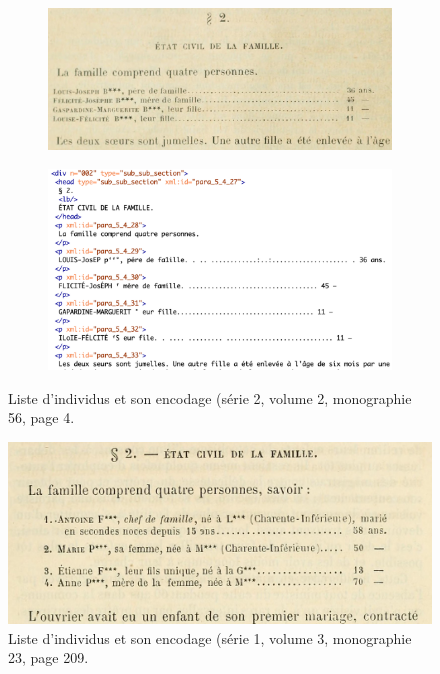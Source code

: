\begin{figure}
    \centering
    \begin{subfigure}{0.8\textwidth}
    \centering
    \includegraphics[width=\textwidth]{img/mono-56-page-4.jpg}
    \caption{}
    \label{fig:mono-56-page-4}
    \end{subfigure}
    
    
    
    \begin{subfigure}{0.7\textwidth}
    \centering
    \includegraphics[width=\textwidth]{img/mono-56-page-4-code.png}
    \caption{}
    \label{fig:mono-56-page-4-code}
    \end{subfigure}
    \caption[Lliste d'individus et de son encodage (\no{} 56)]{Liste d'individus et son encodage (série 2, volume 2, monographie \no{} 56, page 4.}
    \label{fig:ex-mono-56}
\end{figure}

\begin{figure}
    \centering
    \includegraphics[width=14cm]{img/mono-23-page-209.jpg}
    \caption[Liste d'individus et de son encodage (\no{} 23)]{Liste d'individus et son encodage (série 1, volume 3, monographie \no{} 23, page 209.}
    \label{fig:mono-23-page-209}
\end{figure}

